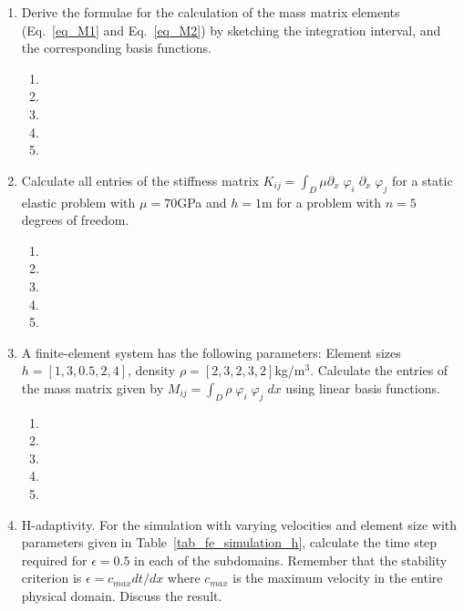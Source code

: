 \begin{enumerate}
\begin{enumerate}
\item[]
\item[] 
\end{enumerate}
\item
Derive the formulae for the calculation of the mass matrix elements (Eq.~\ref{eq_M1} and Eq.~\ref{eq_M2}) by sketching the integration interval, and the corresponding basis functions. 
\begin{enumerate}
\item[]
\item[]
\item[] 
\item[]
\item[] 
\end{enumerate}
\item
Calculate all entries of the stiffness matrix $ K_{i j} = \int_D \mu \partial_x \; \varphi_i \;  \partial_x \; \varphi_j$ for a static elastic problem with $\mu =70$GPa and $h = 1$m for a problem with $n=5$ degrees of freedom. 
\begin{enumerate}
\item[]
\item[]
\item[] 
\item[]
\item[] 
\end{enumerate}
\item
A finite-element system has the following parameters: Element sizes $h=[1, 3, 0.5, 2, 4]$, density $\rho = [2, 3, 2, 3, 2]$kg/m$^3$. Calculate the entries of the mass matrix given by   $M_{ij} = \int_D \rho \; \varphi_i \; \varphi_j \; dx$ using linear basis functions.
\begin{enumerate}
\item[]
\item[]
\item[] 
\item[]
\item[] 
\end{enumerate}
\item
H-adaptivity. For the  simulation with varying velocities and element size with parameters given in Table~\ref{tab_fe_simulation_h}, calculate the time step required for $\epsilon=0.5$ in each of the subdomains. Remember that the stability criterion is $\epsilon=c_{max} dt/dx$ where $c_{max}$ is the maximum velocity in the entire physical domain. Discuss the result. 
\begin{enumerate}

\end{enumerate}
\end{enumerate}
